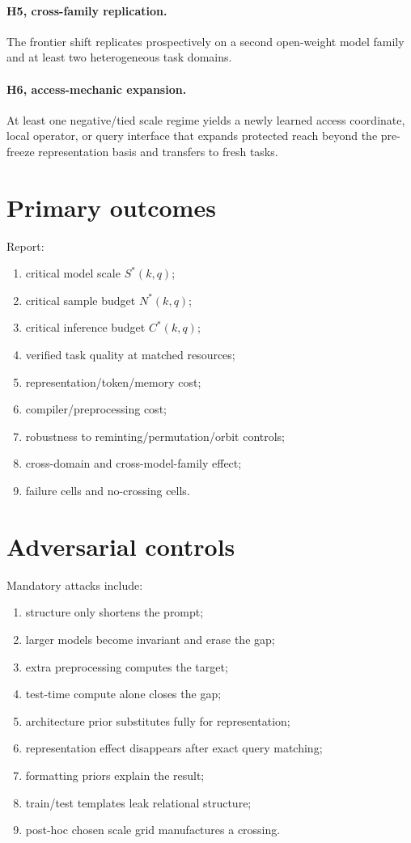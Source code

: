 \documentclass[11pt]{article}
\begin{document}
\paragraph{H5, cross-family replication.}
The frontier shift replicates prospectively on a second open-weight model family and at least two heterogeneous task domains.

\paragraph{H6, access-mechanic expansion.}
At least one negative/tied scale regime yields a newly learned access coordinate, local operator, or query interface that expands protected reach beyond the pre-freeze representation basis and transfers to fresh tasks.

\section{Primary outcomes}
Report:
\begin{enumerate}
    \item critical model scale $S^*(k,q)$;
    \item critical sample budget $N^*(k,q)$;
    \item critical inference budget $C^*(k,q)$;
    \item verified task quality at matched resources;
    \item representation/token/memory cost;
    \item compiler/preprocessing cost;
    \item robustness to reminting/permutation/orbit controls;
    \item cross-domain and cross-model-family effect;
    \item failure cells and no-crossing cells.
\end{enumerate}

\section{Adversarial controls}
Mandatory attacks include:
\begin{enumerate}
    \item structure only shortens the prompt;
    \item larger models become invariant and erase the gap;
    \item extra preprocessing computes the target;
    \item test-time compute alone closes the gap;
    \item architecture prior substitutes fully for representation;
    \item representation effect disappears after exact query matching;
    \item formatting priors explain the result;
    \item train/test templates leak relational structure;
    \item post-hoc chosen scale grid manufactures a crossing.
\end{enumerate}
\end{document}
